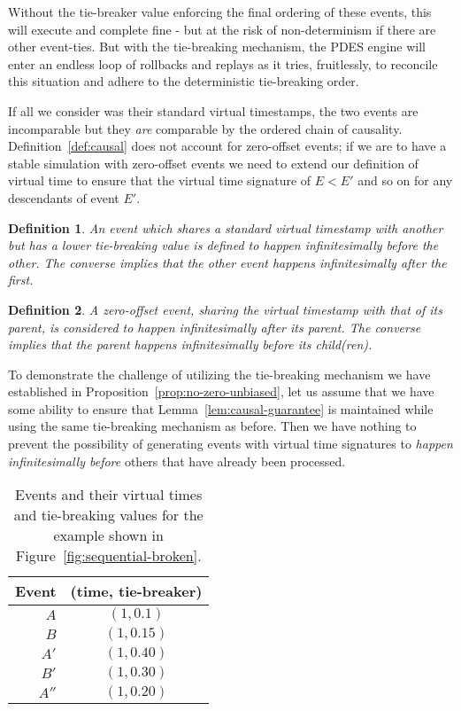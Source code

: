 \documentclass[nonacm,sigconf]{acmart}
\newtheorem{definition}{Definition}
\begin{document}
Without the tie-breaker value enforcing the final ordering of these events, this will execute and complete fine - but at the risk of non-determinism if there are other event-ties. But with the tie-breaking mechanism, the PDES engine will enter an endless loop of rollbacks and replays as it tries, fruitlessly, to reconcile this situation and adhere to the deterministic tie-breaking order.

If all we consider was their standard virtual timestamps, the two events are incomparable but they \emph{are} comparable by the ordered chain of causality. Definition~\ref{def:causal} does not account for zero-offset events; if we are to have a stable simulation with zero-offset events we need to extend our definition of virtual time to ensure that the virtual time signature of $E < E'$ and so on for any descendants of event $E'$.

\begin{definition}
  An event which shares a standard virtual timestamp with another but has a lower tie-breaking value is defined to happen infinitesimally before the other. The converse implies that the other event happens infinitesimally after the first.
\end{definition}

\begin{definition}
  A zero-offset event, sharing the virtual timestamp with that of its parent, is considered to happen infinitesimally after its parent. The converse implies that the parent happens infinitesimally before its child(ren).
\end{definition}

To demonstrate the challenge of utilizing the tie-breaking mechanism we have established in Proposition~\ref{prop:no-zero-unbiased}, let us assume that we have some ability to ensure that Lemma~\ref{lem:causal-guarantee} is maintained while using the same tie-breaking mechanism as before. Then we have nothing to prevent the possibility of generating events with virtual time signatures to \emph{happen infinitesimally before} others that have already been processed.

\begin{table}[t]
  \caption{Events and their virtual times and tie-breaking values for the example shown in Figure~\ref{fig:sequential-broken}.}\label{tab:event-timestamps}
\begin{tabular}{|r|c|}
\hline
Event&(time, tie-breaker)\\\hline
$A$&$(1,0.1)$\\\hline
$B$&$(1,0.15)$\\\hline
$A'$&$(1,0.40)$\\\hline
$B'$&$(1,0.30)$\\\hline
$A''$&$(1,0.20)$\\
\hline
\end{tabular}
\end{table}
\end{document}
